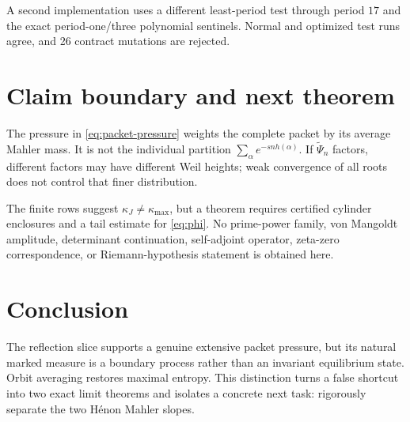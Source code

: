 \documentclass[11pt]{article}
\theoremstyle{remark}
\begin{document}
A second implementation uses a different least-period test through period
$17$ and the exact period-one/three polynomial sentinels.  Normal and
optimized test runs agree, and 26 contract mutations are rejected.

\section{Claim boundary and next theorem}

The pressure in \eqref{eq:packet-pressure} weights the complete packet by
its average Mahler mass.  It is not the individual partition
$\sum_\alpha e^{-sn h(\alpha)}$.  If $\widetilde\Psi_n$ factors, different
factors may have different Weil heights; weak convergence of all roots does
not control that finer distribution.

The finite rows suggest $\kappa_J\ne\kappa_{\max}$, but a theorem requires
certified cylinder enclosures and a tail estimate for \eqref{eq:phi}.  No
prime-power family, von Mangoldt amplitude, determinant continuation,
self-adjoint operator, zeta-zero correspondence, or Riemann-hypothesis
statement is obtained here.

\section{Conclusion}

The reflection slice supports a genuine extensive packet pressure, but its
natural marked measure is a boundary process rather than an invariant
equilibrium state.  Orbit averaging restores maximal entropy.  This
distinction turns a false shortcut into two exact limit theorems and isolates
a concrete next task: rigorously separate the two H\'enon Mahler slopes.



\end{document}
